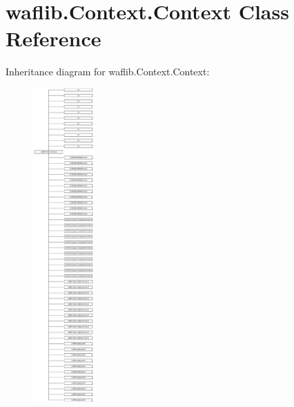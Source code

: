 \hypertarget{classwaflib_1_1_context_1_1_context}{}\section{waflib.\+Context.\+Context Class Reference}
\label{classwaflib_1_1_context_1_1_context}
Inheritance diagram for waflib.\+Context.\+Context\+:\begin{figure}[H]
\begin{center}
\leavevmode
\includegraphics[height=12.000000cm]{classwaflib_1_1_context_1_1_context}
\end{center}
\end{figure}
